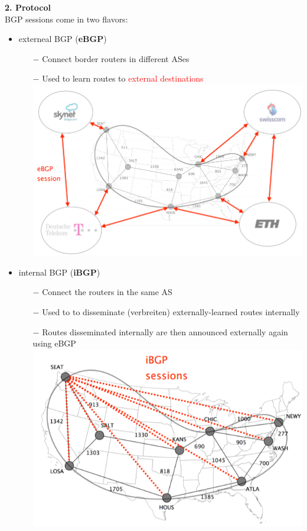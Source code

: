 \documentclass[a4paper, fontsize=8pt, landscape, DIV=1]{scrartcl}
\begin{document}
\begin{multicols*}{4}
 		\textbf{2. Protocol}\\
 		BGP sessions come in two flavors: 
 		\begin{itemize}[noitemsep]
 			\item externeal BGP (\textbf{eBGP})
 			\begin{itemize}
 				\item[$-$] Connect border routers in different ASes
 				\item[$-$] Used to learn routes to \textcolor{Red}{external destinations}\\
 				\includegraphics[width=0.8\columnwidth]{images/Network_Layer/eBGP_session.png}
 			\end{itemize}
 			\item internal BGP (\textbf{iBGP})
 			\begin{itemize}
 				\item[$-$] Connect the routers in the same AS
 				\item[$-$] Used to to disseminate (verbreiten) externally-learned routes internally
 				\item[$-$] Routes disseminated internally are then announced externally again using eBGP\\ 
 				\includegraphics[width=0.8\columnwidth]{images/Network_Layer/iBGP_session.png}

\end{itemize}
\end{itemize}
\end{multicols*}
\end{document}
